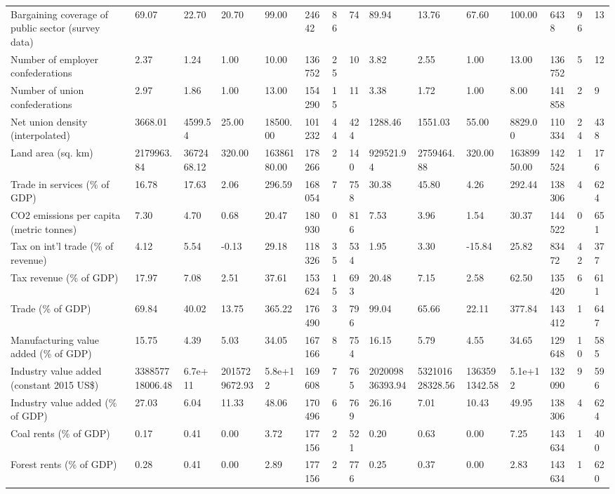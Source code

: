 \begin{longtable}{lllllllllllllll}
\addlinespace
Bargaining coverage of public sector (survey data) & 69.07 & 22.70 & 20.70 & 99.00 & 24642 & 86 & 74 & 89.94 & 13.76 & 67.60 & 100.00 & 6438 & 96 & 13\\
Number of employer confederations & 2.37 & 1.24 & 1.00 & 10.00 & 136752 & 25 & 10 & 3.82 & 2.55 & 1.00 & 13.00 & 136752 & 5 & 12\\
Number of union confederations & 2.97 & 1.86 & 1.00 & 13.00 & 154290 & 15 & 11 & 3.38 & 1.72 & 1.00 & 8.00 & 141858 & 2 & 9\\
Net union density (interpolated) & 3668.01 & 4599.54 & 25.00 & 18500.00 & 101232 & 44 & 424 & 1288.46 & 1551.03 & 55.00 & 8829.00 & 110334 & 24 & 438\\
Land area (sq. km) & 2179963.84 & 3672468.12 & 320.00 & 16386180.00 & 178266 & 2 & 140 & 929521.94 & 2759464.88 & 320.00 & 16389950.00 & 142524 & 1 & 176\\
\addlinespace
Trade in services (\% of GDP) & 16.78 & 17.63 & 2.06 & 296.59 & 168054 & 7 & 758 & 30.38 & 45.80 & 4.26 & 292.44 & 138306 & 4 & 624\\
CO2 emissions per capita (metric tonnes) & 7.30 & 4.70 & 0.68 & 20.47 & 180930 & 0 & 816 & 7.53 & 3.96 & 1.54 & 30.37 & 144522 & 0 & 651\\
Tax on int'l trade (\% of revenue) & 4.12 & 5.54 & -0.13 & 29.18 & 118326 & 35 & 534 & 1.95 & 3.30 & -15.84 & 25.82 & 83472 & 42 & 377\\
Tax revenue (\% of GDP) & 17.97 & 7.08 & 2.51 & 37.61 & 153624 & 15 & 693 & 20.48 & 7.15 & 2.58 & 62.50 & 135420 & 6 & 611\\
Trade (\% of GDP) & 69.84 & 40.02 & 13.75 & 365.22 & 176490 & 3 & 796 & 99.04 & 65.66 & 22.11 & 377.84 & 143412 & 1 & 647\\
\addlinespace
Manufacturing value added (\% of GDP) & 15.75 & 4.39 & 5.03 & 34.05 & 167166 & 8 & 754 & 16.15 & 5.79 & 4.55 & 34.65 & 129648 & 10 & 585\\
Industry value added (constant 2015 US\$) & 338857718006.48 & 6.7e+11 & 2015729672.93 & 5.8e+12 & 169608 & 7 & 765 & 202009836393.94 & 532101628328.56 & 1363591342.58 & 5.1e+12 & 132090 & 9 & 596\\
Industry value added (\% of GDP) & 27.03 & 6.04 & 11.33 & 48.06 & 170496 & 6 & 769 & 26.16 & 7.01 & 10.43 & 49.95 & 138306 & 4 & 624\\
Coal rents (\% of GDP) & 0.17 & 0.41 & 0.00 & 3.72 & 177156 & 2 & 521 & 0.20 & 0.63 & 0.00 & 7.25 & 143634 & 1 & 400\\
Forest rents (\% of GDP) & 0.28 & 0.41 & 0.00 & 2.89 & 177156 & 2 & 776 & 0.25 & 0.37 & 0.00 & 2.83 & 143634 & 1 & 620\\

\end{longtable}
